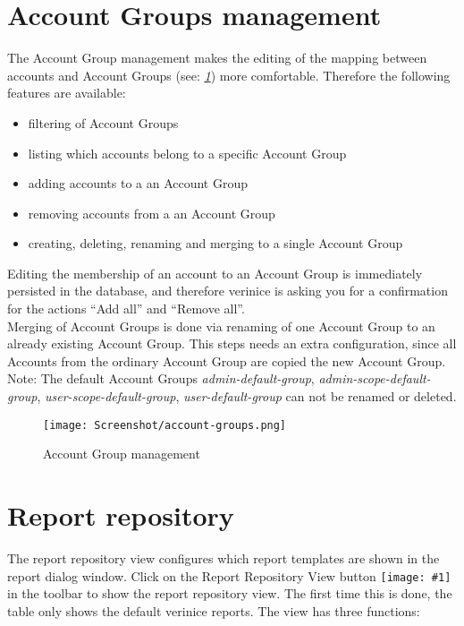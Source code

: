 \documentclass[a4paper,10pt]{book}
\newcommand{\icon}[1]{\texttt{[image: \#1]}}
\begin{document}
\section{Account Groups management} \label{sec:Account-Groups-management}
\label{sec:account-groups-management}

The Account Group management makes the editing of the mapping between
accounts and Account Groups (see:
\textit{\ref{fig:account-groups-management}}) more
comfortable. Therefore the following features are available:

\begin{itemize}
\item filtering of Account Groups
\item listing which accounts belong to a specific Account Group
\item adding accounts to a an Account Group
\item removing accounts from a an Account Group
\item creating, deleting, renaming and merging to a single Account Group
\end{itemize}

Editing the membership of an account to an Account Group is
immediately persisted in the database, and therefore verinice is
asking you for a confirmation for the actions ``Add all'' and ``Remove
all''.\\

Merging of Account Groups is done via renaming of one Account Group to
an already existing Account Group. This steps needs an extra
configuration, since all Accounts from the ordinary Account Group are
copied the new Account Group.\\

Note: The default Account Groups \textit{admin-default-group},
\textit{admin-scope-default-group}, \textit{user-scope-default-group},
\textit{user-default-group} can not be renamed or deleted.

\begin{figure}
  \centering
  \texttt{[image: Screenshot/account-groups.png]}
  \caption{Account Group management}
\label{fig:account-groups-management}
\end{figure}

\section{Report repository}
\label{sec:report-repository}

The report repository view configures which report templates are shown
in the report dialog window. Click on the Report Repository View
button \icon{Icon/folder_table.png} in the
toolbar to show the report repository view. The first time this is
done, the table only shows the default verinice reports. The view has
three functions:
\end{document}
